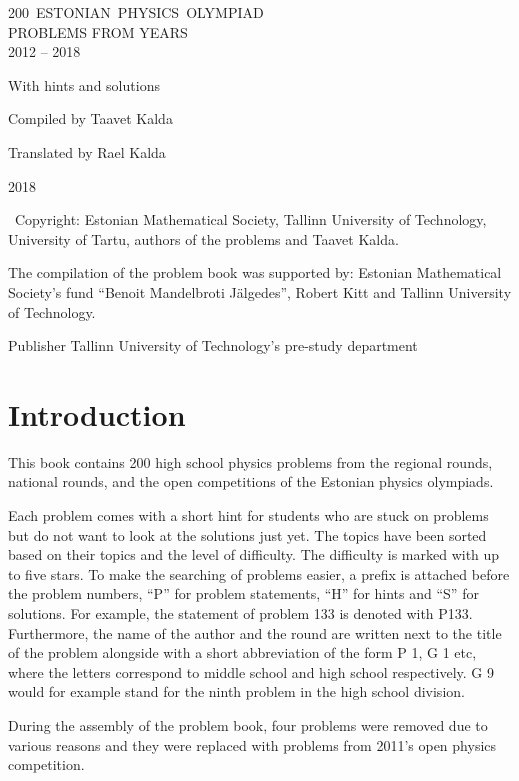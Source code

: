 \documentclass[11pt]{article}
\begin{document}
\begin{titlepage}
	\centering
	\vspace{10cm}
	{\sffamily\Huge \mbox{200 ESTONIAN PHYSICS OLYMPIAD}\\ PROBLEMS FROM YEARS\\ 2012 -- 2018\par}
	\vspace{1cm}
	{\Large With hints and solutions\par}
	\vfill
	{\Large Compiled by Taavet Kalda\par}
	\vspace{1cm}
	{\Large Translated by Rael Kalda}

	\vfill

	{\large 2018}
\end{titlepage}

\addtocounter{page}{1}
\mbox{}\vfill

\textcopyright~Copyright: Estonian Mathematical Society, Tallinn University of Technology,
University of Tartu, authors of the problems and Taavet Kalda.
\vspace{0.5\baselineskip}

The compilation of the problem book was supported by: Estonian Mathematical Society's fund ``Benoit Mandelbroti Jälgedes'', Robert Kitt and Tallinn University of Technology.
\vspace{0.5\baselineskip}

Publisher Tallinn University of Technology's pre-study department
\newpage

\tableofcontents
\newpage

{\setlength{\parindent}{24pt}
\section{Introduction}

This book contains 200 high school physics problems from the regional rounds, national rounds, and the open competitions of the Estonian physics olympiads.

Each problem comes with a short hint for students who are stuck on problems but do not want to look at the solutions just yet. The topics have been sorted based on their topics and the level of difficulty. The difficulty is marked with up to five stars. To make the searching of problems easier, a prefix is attached before the problem numbers, \enquote{P} for problem statements, \enquote{H} for hints and \enquote{S} for solutions. For example, the statement of problem 133 is denoted with P133. Furthermore, the name of the author and the round are written next to the title of the problem alongside with a short abbreviation of the form P 1, G 1 etc, where the letters correspond to middle school and high school respectively. G 9 would for example stand for the ninth problem in the high school division.

During the assembly of the problem book, four problems were removed due to various reasons and they were replaced with problems from 2011's open physics competition.}
\newpage
\setlength{\parindent}{0pt}
\end{document}
